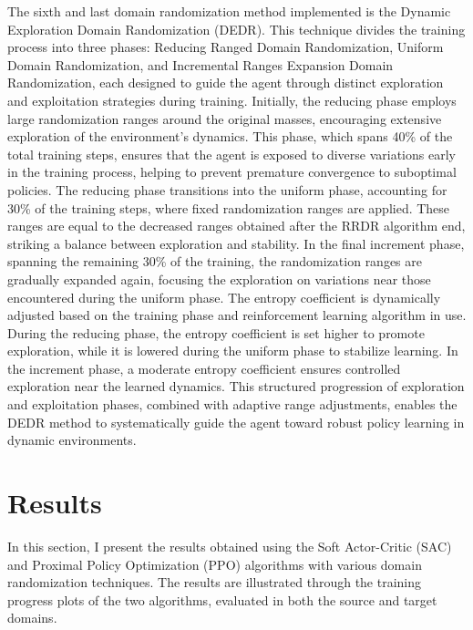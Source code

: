 \documentclass[12pt]{article}
\begin{document}
The sixth and last domain randomization method implemented is the Dynamic Exploration Domain Randomization (DEDR). This technique divides the training process into three phases: Reducing Ranged Domain Randomization, Uniform Domain Randomization, and Incremental Ranges Expansion Domain Randomization, each designed to guide the agent through distinct exploration and exploitation strategies during training. Initially, the reducing phase employs large randomization ranges around the original masses, encouraging extensive exploration of the environment's dynamics. This phase, which spans 40\% of the total training steps, ensures that the agent is exposed to diverse variations early in the training process, helping to prevent premature convergence to suboptimal policies. The reducing phase transitions into the uniform phase, accounting for 30\% of the training steps, where fixed randomization ranges are applied. These ranges are equal to the decreased ranges obtained after the RRDR algorithm end, striking a balance between exploration and stability. In the final increment phase, spanning the remaining 30\% of the training, the randomization ranges are gradually expanded again, focusing the exploration on variations near those encountered during the uniform phase. The entropy coefficient is dynamically adjusted based on the training phase and reinforcement learning algorithm in use. During the reducing phase, the entropy coefficient is set higher to promote exploration, while it is lowered during the uniform phase to stabilize learning. In the increment phase, a moderate entropy coefficient ensures controlled exploration near the learned dynamics. This structured progression of exploration and exploitation phases, combined with adaptive range adjustments, enables the DEDR method to systematically guide the agent toward robust policy learning in dynamic environments.

\section{Results}

In this section, I present the results obtained using the Soft Actor-Critic (SAC) and Proximal Policy Optimization (PPO) algorithms with various domain randomization techniques. The results are illustrated through the training progress plots of the two algorithms, evaluated in both the source and target domains.
\end{document}
